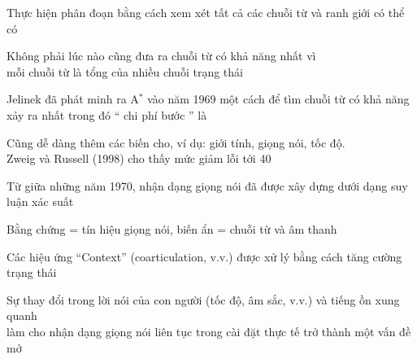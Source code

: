 \documentclass{article}
\begin{document}
\begin{huge}
Thực hiện phân đoạn bằng cách xem xét tất cả các chuỗi từ và ranh giới có thể có

Không phải lúc nào cũng đưa ra chuỗi từ có khả năng nhất vì\\
mỗi chuỗi từ là tổng của nhiều chuỗi trạng thái

Jelinek đã phát minh ra A$^*$ vào năm 1969 một cách để tìm chuỗi từ có khả năng xảy ra nhất\al
   trong đó `` chi phí bước '' là 






\vspace{0.5in}

\textwidth
{}

Cũng dễ dàng thêm các biến cho, ví dụ: giới tính, giọng nói, tốc độ.\\
Zweig và Russell (1998) cho thấy mức giảm lỗi tới 40%


Từ giữa những năm 1970, nhận dạng giọng nói đã được xây dựng dưới dạng suy luận xác suất

Bằng chứng = tín hiệu giọng nói, biến ẩn = chuỗi từ và âm thanh

Các hiệu ứng ``Context'' (coarticulation, v.v.) được xử lý bằng cách tăng cường trạng thái

Sự thay đổi trong lời nói của con người (tốc độ, âm sắc, v.v.) và tiếng ồn xung quanh\\
làm cho nhận dạng giọng nói liên tục trong cài đặt thực tế trở thành một vấn đề mở
  



\end{huge} 
\end{document}
